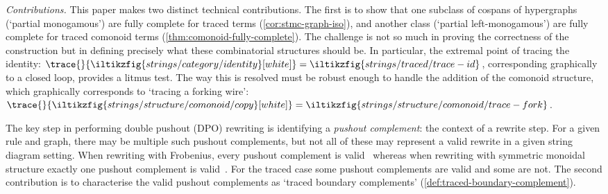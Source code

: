 \emph{Contributions.}
This paper makes two distinct technical contributions.
The first is to show that one subclass of cospans of hypergraphs (`partial
monogamous') are fully complete for traced terms (\cref{cor:stmc-graph-iso}),
and another class (`partial left-monogamous') are fully complete for traced
comonoid terms (\cref{thm:comonoid-fully-complete}).
The challenge is not so much in proving the correctness of the construction but
in defining precisely what these combinatorial structures should be.
In particular, the extremal point of tracing the identity: \(
    \trace{}{
        \iltikzfig{strings/category/identity}[white]
    }
    =
    \iltikzfig{strings/traced/trace-id}
\), corresponding graphically to a closed loop, provides a litmus test.
The way this is resolved must be robust enough to handle the addition of the
comonoid structure, which graphically corresponds to `tracing a forking wire':
\(
    \trace{}{
        \iltikzfig{strings/structure/comonoid/copy}[white]
    }
    =
    \iltikzfig{strings/structure/comonoid/trace-fork}
\).

The key step in performing double pushout (DPO) rewriting is identifying a
\emph{pushout complement}: the context of a rewrite step.
For a given rule and graph, there may be multiple such pushout complements, but
not all of these may represent a valid rewrite in a given string diagram
setting.
When rewriting with Frobenius, every pushout complement is
valid~\cite{bonchi2022string} whereas when rewriting with symmetric monoidal
structure exactly one pushout complement is valid~\cite{bonchi2022stringa}.
For the traced case some pushout complements are valid and some are not.
The second contribution is to characterise the valid pushout complements as
`traced boundary complements' (\cref{def:traced-boundary-complement}).

